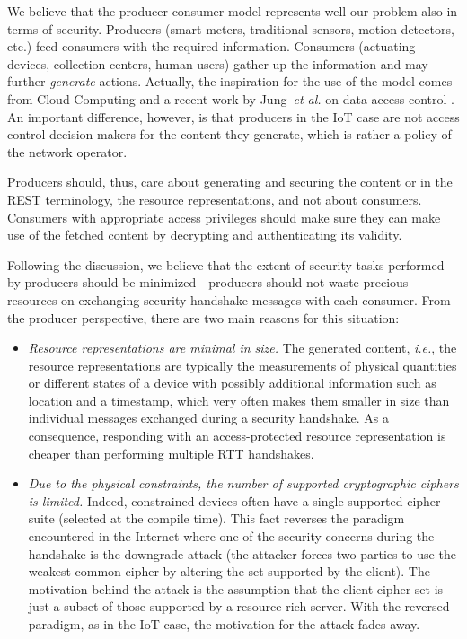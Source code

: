 \documentclass[conference]{IEEEtran}
\begin{document}
We believe that the producer-consumer model represents well our problem
also in terms of security. Producers (smart meters, traditional sensors, motion
detectors, etc.) feed consumers with the required information. Consumers
(actuating devices, collection centers, human users) gather up the information
and may further \textit{generate} actions. Actually, the inspiration for the use
of the model comes from Cloud Computing and a recent work by Jung~\emph{et al.}
on data access control \cite{jungprivacy}. An important difference, however, is
that producers in the IoT case are not access control decision makers for the
content they generate, which is rather a policy of the network operator. 

Producers should, thus, care about generating and securing the content or in the
REST terminology, the resource representations, and not about
consumers. Consumers with appropriate access 
privileges should make sure they can make use of the fetched content by
decrypting and authenticating its validity.







Following the discussion, we believe that the extent of security tasks performed
by producers should be minimized---producers should not waste precious
resources on exchanging security handshake messages with each consumer. 
From the producer perspective, there are two main reasons for this situation:
\begin{itemize}

\item \textit{Resource representations are minimal in size.} The generated
  content, \emph{i.e.}, the resource representations are typically the measurements of
  physical quantities or different states of a device with possibly additional
  information such as location and a timestamp, which very often makes them smaller in size than individual messages exchanged during a security handshake.  As a consequence, responding with an access-protected resource representation is cheaper than performing multiple RTT handshakes.
\item \textit{Due to the physical constraints, the number of supported
    cryptographic ciphers is limited.} Indeed, constrained devices often have a
  single supported cipher suite (selected at the compile time). This fact
  reverses the paradigm encountered in the Internet where one of the security
  concerns during the handshake is the downgrade attack (the attacker forces two
  parties to use the weakest common cipher by altering the set supported by the
  client). The motivation behind the attack is the assumption that the client
  cipher set is just a subset of those supported by a resource rich server. With the reversed paradigm, as in the IoT case, the motivation for the attack fades away.

\end{itemize}
\end{document}
